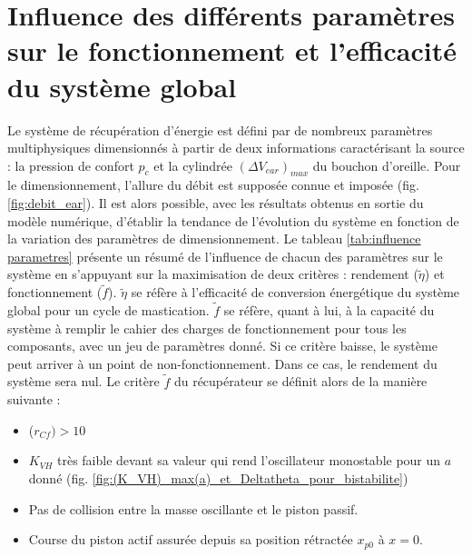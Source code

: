 \section{Influence des différents paramètres sur le fonctionnement et l'efficacité du système global}
\label{subsec:6.3_Influence des differents parametres sur le fonctionnement et l efficacite du systeme global}
Le système de récupération d'énergie est défini par de nombreux paramètres multiphysiques dimensionnés à partir de deux informations caractérisant la source : la pression de confort $p_c$ et la cylindrée $(\Delta V_{ear})_{max}$ du bouchon d'oreille. Pour le dimensionnement, l'allure du débit est supposée connue et imposée (fig. \ref{fig:debit_ear}). Il est alors possible, avec les résultats obtenus en sortie du modèle numérique, d'établir la tendance de l'évolution du système en fonction de la variation des paramètres de dimensionnement. Le tableau \ref{tab:influence parametres} présente un résumé de l'influence de chacun des paramètres sur le système en s'appuyant sur la maximisation de deux critères : rendement ($\tilde{\eta}$) et fonctionnement ($\tilde{f}$). $\tilde{\eta}$ se réfère à l'efficacité de conversion énergétique du système global pour un cycle de mastication. $\tilde{f}$ se réfère, quant à lui, à la capacité du système à remplir le cahier des charges de fonctionnement pour tous les composants, avec un jeu de paramètres donné. Si ce critère baisse, le système peut arriver à un point de non-fonctionnement. Dans ce cas, le rendement du système sera nul. Le critère $\tilde{f}$ du récupérateur se définit alors de la manière suivante :
\begin{itemize}[label=$\bullet$]
	\item ($r_{Cf})>10$
  	\item $K_{VH}$ très faible devant sa valeur qui rend l'oscillateur monostable pour un $a$ donné (fig. \ref{fig:(K_VH)_max(a)_et_Deltatheta_pour_bistabilite})
    \item Pas de collision entre la masse oscillante et le piston passif.
    \item Course du piston actif assurée depuis sa position rétractée $x_{p0}$ à $x=0$.
\end{itemize}

